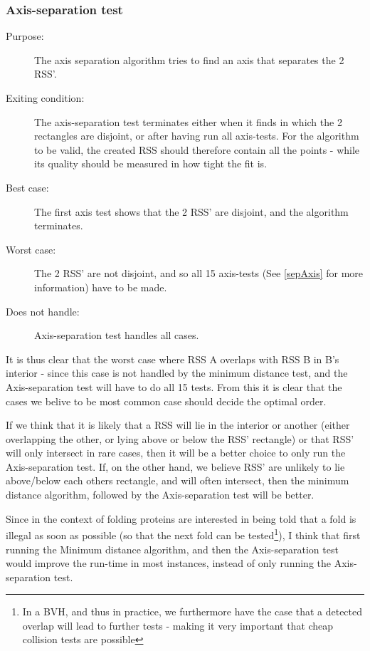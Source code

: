 \subsubsection{Axis-separation test}
\begin{description}
\item[Purpose:] The axis separation algorithm tries to find an axis that separates the 2 RSS'. 
\item[Exiting condition:] The axis-separation test terminates either when it finds in which the 2 rectangles are disjoint, or after having run all axis-tests. For the algorithm to be valid, the created RSS should therefore contain all the points - while its quality should be measured in how tight the fit is.
\item[Best case:] The first axis test shows that the 2 RSS' are disjoint, and the algorithm terminates. 
\item[Worst case:] The 2 RSS' are not disjoint, and so all 15 axis-tests (See \ref{sepAxis} for more information) have to be made.
\item[Does not handle:] Axis-separation test handles all cases.
\end{description}

It is thus clear that the worst case where RSS A overlaps with RSS B in B's interior - since this case is not handled by the minimum distance test, and the Axis-separation test will have to do all 15 tests. From this it is clear that the cases we belive to be most common case should decide the optimal order. 

If we think that it is likely that a RSS will lie in the interior or another (either overlapping the other, or lying above or below the RSS' rectangle) or that RSS' will only intersect in rare cases, then it will be a better choice to only run the Axis-separation test. If, on the other hand, we believe RSS' are unlikely to lie above/below each others rectangle, and will often intersect, then the minimum distance algorithm, followed by the Axis-separation test will be better.

Since in the context of folding proteins are interested in being told that a fold is illegal as soon as possible (so that the next fold can be tested\footnote{In a BVH, and thus in practice, we furthermore have the case that a detected overlap will lead to further tests - making it very important that cheap collision tests are possible}), I think that first running the Minimum distance algorithm, and then the Axis-separation test would improve the run-time in most instances, instead of only running the Axis-separation test.


